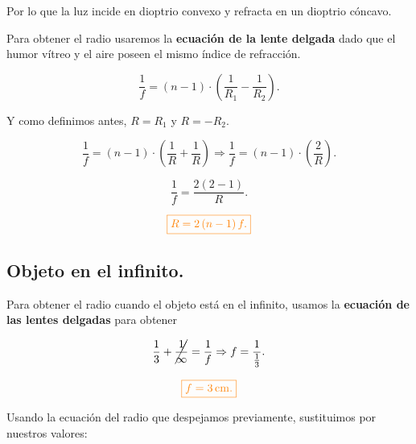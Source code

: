 \documentclass[a4paper,12pt]{article} %
\begin{document}
\begin{justify}
	Por lo que la luz incide en dioptrio convexo y refracta en un dioptrio cóncavo.
\end{justify}

\begin{justify}
	Para obtener el radio usaremos la \textbf{ecuación de la lente delgada} dado que el humor vítreo y el aire poseen el mismo índice de refracción.
\end{justify}

\[ \frac{1}{f} = \left(n - 1\right) \cdot \left(\frac{1}{R_1} - \frac{1}{R_2}\right). \]

\begin{justify}
	Y como definimos antes, \(R = R_1\) y \( R = -R_2\).
\end{justify}

\[ \frac{1}{f} = \left(n - 1\right) \cdot \left(\frac{1}{R} + \frac{1}{R}\right) \Rightarrow \frac{1}{f} = \left(n - 1 \right) \cdot \left(\frac{2}{R}\right). \]

\vspace{\baselineskip}

\[ \frac{1}{f} = \frac{2\left(2-1\right)}{R}. \]

\vspace{\baselineskip}

\[\textcolor{orange}{\boxed{R = 2\left(n-1\right)f.}}\]

\subsection{Objeto en el infinito.}

\begin{justify}
	Para obtener el radio cuando el objeto está en el infinito, usamos la \textbf{ecuación de las lentes delgadas} para obtener 
\end{justify}

\[ \frac{1}{3} + \cancel{\frac{1}{\infty}} = \frac{1}{f} \Rightarrow f = \frac{1}{\frac{1}{3}}. \]

\vspace{\baselineskip}

\[ \textcolor{orange}{\boxed{f = 3 \, \mathrm{cm}.}} \]

\vspace{\baselineskip}

\begin{justify}
	Usando la ecuación del radio que despejamos previamente, sustituimos por nuestros valores:
\end{justify}
\end{document}
